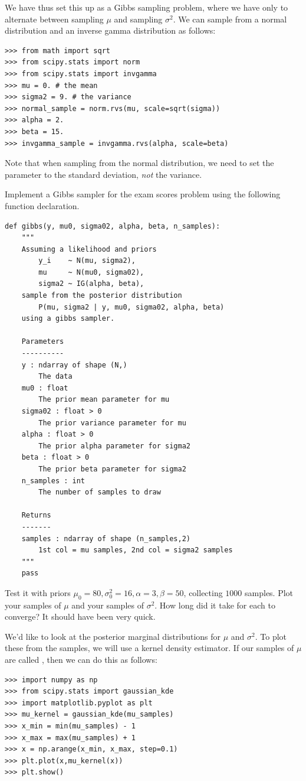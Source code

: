 We have thus set this up as a Gibbs sampling problem, where we have only to alternate between sampling $\mu$ and sampling $\sigma^{2}$.
We can sample from a normal distribution and an inverse gamma distribution as follows:
\begin{lstlisting}
>>> from math import sqrt
>>> from scipy.stats import norm
>>> from scipy.stats import invgamma
>>> mu = 0. # the mean
>>> sigma2 = 9. # the variance
>>> normal_sample = norm.rvs(mu, scale=sqrt(sigma))
>>> alpha = 2.
>>> beta = 15.
>>> invgamma_sample = invgamma.rvs(alpha, scale=beta)
\end{lstlisting}
Note that when sampling from the normal distribution, we need to set the  parameter to the standard deviation, \emph{not} the variance.

\begin{problem}
Implement a Gibbs sampler for the exam scores problem using the following function declaration.
\begin{lstlisting}
def gibbs(y, mu0, sigma02, alpha, beta, n_samples):
    """
    Assuming a likelihood and priors
        y_i    ~ N(mu, sigma2),
        mu     ~ N(mu0, sigma02),
        sigma2 ~ IG(alpha, beta),
    sample from the posterior distribution
        P(mu, sigma2 | y, mu0, sigma02, alpha, beta)
    using a gibbs sampler.

    Parameters
    ----------
    y : ndarray of shape (N,)
        The data
    mu0 : float
        The prior mean parameter for mu
    sigma02 : float > 0
        The prior variance parameter for mu
    alpha : float > 0
        The prior alpha parameter for sigma2
    beta : float > 0
        The prior beta parameter for sigma2
    n_samples : int
        The number of samples to draw

    Returns
    -------
    samples : ndarray of shape (n_samples,2)
        1st col = mu samples, 2nd col = sigma2 samples
    """
    pass
\end{lstlisting}
Test it with priors $\mu_{0}=80, \sigma_{0}^{2} = 16, \alpha = 3, \beta = 50$, collecting $1000$ samples. Plot your samples of $\mu$ and your samples of $\sigma^{2}$. How long did it take for each to converge? It should have been very quick.
\end{problem}

We'd like to look at the posterior marginal distributions for $\mu$ and $\sigma^2$.
To plot these from the samples, we will use a kernel density estimator.
If our samples of $\mu$ are called , then we can do this as follows:
\begin{lstlisting}
>>> import numpy as np
>>> from scipy.stats import gaussian_kde
>>> import matplotlib.pyplot as plt
>>> mu_kernel = gaussian_kde(mu_samples)
>>> x_min = min(mu_samples) - 1
>>> x_max = max(mu_samples) + 1
>>> x = np.arange(x_min, x_max, step=0.1)
>>> plt.plot(x,mu_kernel(x))
>>> plt.show()
\end{lstlisting}

